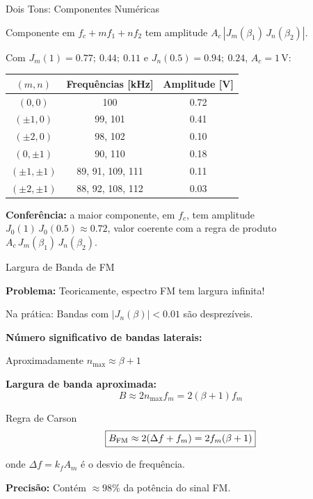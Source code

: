 
\begin{frame}{Dois Tons: Componentes Numéricas}

\footnotesize
Componente em $f_c + m f_1 + n f_2$ tem amplitude $A_c\,|J_m(\beta_1)\, J_n(\beta_2)|$.

Com $J_m(1) = 0.77;\ 0.44;\ 0.11$ e $J_n(0.5) = 0.94;\ 0.24$, $A_c = 1$\,V:

\begin{center}
\scriptsize
\renewcommand{\arraystretch}{1.1}
\begin{tabular}{|c|c|c|}
\hline
$(m,n)$ & Frequências [kHz] & Amplitude [V] \\
\hline
$(0,0)$         & 100              & 0.72 \\
$(\pm 1,0)$     & 99, 101          & 0.41 \\
$(\pm 2,0)$     & 98, 102          & 0.10 \\
$(0,\pm 1)$     & 90, 110          & 0.18 \\
$(\pm 1,\pm 1)$ & 89, 91, 109, 111 & 0.11 \\
$(\pm 2,\pm 1)$ & 88, 92, 108, 112 & 0.03 \\
\hline
\end{tabular}
\end{center}

\pause
\textbf{Conferência:} a maior componente, em $f_c$, tem amplitude $J_0(1)\,J_0(0.5) \approx 0.72$, valor coerente com a regra de produto $A_c\,J_m(\beta_1)\,J_n(\beta_2)$.

\end{frame}


\begin{frame}{Largura de Banda de FM}

\textbf{Problema:} Teoricamente, espectro FM tem largura infinita!

Na prática: Bandas com $|J_n(\beta)| < 0.01$ são desprezíveis.

\vspace{0.3cm}

\textbf{Número significativo de bandas laterais:}

Aproximadamente $n_{\max} \approx \beta + 1$

\textbf{Largura de banda aproximada:}
\[
B \approx 2n_{\max} f_m = 2(\beta + 1)f_m
\]

\begin{block}{Regra de Carson}
\[
\boxed{B_{\text{FM}} \approx 2(\Delta f + f_m) = 2f_m(\beta + 1)}
\]
\end{block}

onde $\Delta f = k_f A_m$ é o desvio de frequência.

\textbf{Precisão:} Contém $\approx 98\%$ da potência do sinal FM.

\end{frame}

